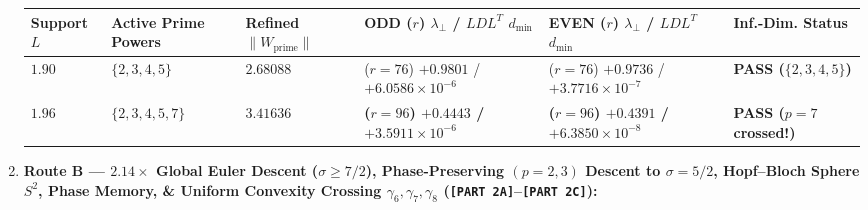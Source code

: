 \documentclass[
  11pt,
]{article}
\newcounter{none} %
\begin{document}
\begin{enumerate}
  {\def\LTcaptype{none} %
  \begin{longtable}[]{@{}
    >{\centering\arraybackslash}p{}
    >{\centering\arraybackslash}p{}
    >{\centering\arraybackslash}p{}
    >{\centering\arraybackslash}p{}
    >{\centering\arraybackslash}p{}
    >{\raggedright\arraybackslash}p{}@{}}
  \toprule\noalign{}
  \begin{minipage}[b]{\linewidth}\centering
  Support \(L\)
  \end{minipage} & \begin{minipage}[b]{\linewidth}\centering
  Active Prime Powers
  \end{minipage} & \begin{minipage}[b]{\linewidth}\centering
  Refined \(\|W_{\text{prime}}\|\)
  \end{minipage} & \begin{minipage}[b]{\linewidth}\centering
  ODD (\(r\)) \(\lambda_\perp\) / \(LDL^T\) \(d_{\min}\)
  \end{minipage} & \begin{minipage}[b]{\linewidth}\centering
  EVEN (\(r\)) \(\lambda_\perp\) / \(LDL^T\) \(d_{\min}\)
  \end{minipage} & \begin{minipage}[b]{\linewidth}\raggedright
  Inf.-Dim. Status
  \end{minipage} \\
  \midrule\noalign{}
  \endhead
  \bottomrule\noalign{}
  \endlastfoot
  \(1.90\) & \(\{2, 3, 4, 5\}\) & \(2.68088\) & (\(r=76\)) \(+0.9801\) /
  \(+6.0586 \times 10^{-6}\) & (\(r=76\)) \(+0.9736\) /
  \(+3.7716 \times 10^{-7}\) & \textbf{PASS (\(\{2,3,4,5\}\))} \\
  \textbf{\(1.96\)} & \textbf{\(\{2, 3, 4, 5, 7\}\)} &
  \textbf{\(3.41636\)} & \textbf{(\(r=96\)) \(+0.4443\) /
  \(+3.5911 \times 10^{-6}\)} & \textbf{(\(r=96\)) \(+0.4391\) /
  \(+6.3850 \times 10^{-8}\)} & \textbf{PASS (\(p = 7\) crossed!)} \\
  \end{longtable}
  }
\item
  \textbf{Route B --- \(2.14\times\) Global Euler Descent
  (\(\sigma \ge 7/2\)), Phase-Preserving \((p=2,3)\) Descent to
  \(\sigma = 5/2\), Hopf--Bloch Sphere \(S^2\), Phase Memory, \& Uniform
  Convexity Crossing \(\gamma_6, \gamma_7, \gamma_8\)
  (\texttt{{[}PART\ 2A{]}}--\texttt{{[}PART\ 2C{]}}):}


\end{enumerate}
\end{document}
